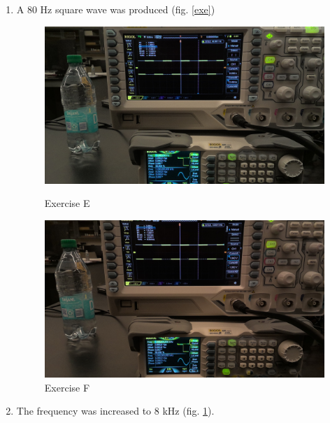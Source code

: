 \documentclass{article}
\begin{document}
\begin{enumerate}[label=(\alph*)]
                \item A 80 Hz square wave was produced (fig. \ref{exe})
                \begin{figure}[p]
                    \begin{minipage}{\textwidth/2}
                        \includegraphics[width=\linewidth]{e.jpg}
                        \caption{Exercise E}
                        \label{exe}
                    \end{minipage}
                    \begin{minipage}{\textwidth/2}
                        \includegraphics[width=\linewidth]{f.jpg}
                        \caption{Exercise F}
                        \label{exf}
                    \end{minipage}
                \end{figure}

                \item The frequency was increased to 8 kHz (fig. \ref{exf}).


\end{enumerate}
\end{document}
